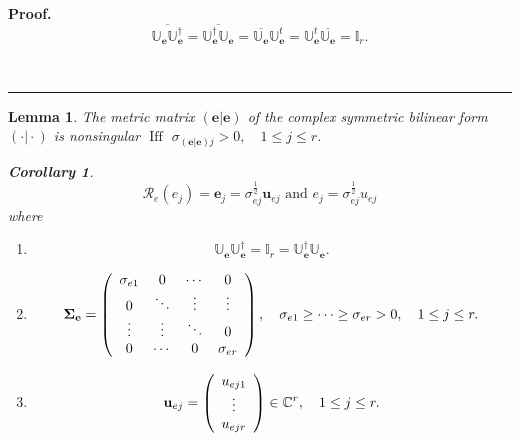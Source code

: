 \documentclass[aps,preprint]{revtex4}%
\newtheorem{corollary}[theorem]{Corollary}
\newtheorem{lemma}[theorem]{Lemma}
\newenvironment{proof}[1][Proof]{\noindent\textbf{#1.} }{\ \rule{0.5em}{0.5em}}
\begin{document}
\begin{proof}%
\begin{equation}
\overline{\mathbb{U}_{\mathbf{e}}\mathbb{U}_{\mathbf{e}}^{\dagger}}%
=\overline{\mathbb{U}_{\mathbf{e}}^{\dagger}\mathbb{U}_{\mathbf{e}}}%
=\overline{\mathbb{U}_{\mathbf{e}}}\mathbb{U}_{\mathbf{e}}^{t}=\mathbb{U}%
_{\mathbf{e}}^{t}\overline{\mathbb{U}_{\mathbf{e}}}=\mathbb{I}_{r}.
\end{equation}

\end{proof}

\begin{lemma}
The metric matrix $\left(  \left.  \mathbf{e}\right\vert \mathbf{e}\right)  $
of the complex symmetric bilinear form $\left(  \left.  \cdot\right\vert
\cdot\right)  $ is nonsingular $\operatorname*{Iff}$ $\sigma_{\left(  \left.
\mathbf{e}\right\vert \mathbf{e}\right)  j}>0,\quad1\leq j\leq r$.

\begin{corollary}%
\begin{equation}
\mathcal{R}_{e}\left(  e_{j}\right)  =\mathbf{e}_{j}=\sigma_{ej}^{\frac{1}{2}%
}\mathbf{u}_{ej}\text{ and }e_{j}=\sigma_{ej}^{\frac{1}{2}}u_{ej}%
\end{equation}
where
\end{corollary}

\begin{enumerate}
\item
\begin{equation}
\mathbb{U}_{\mathbf{e}}\mathbb{U}_{\mathbf{e}}^{\dagger}=\mathbb{I}%
_{r}=\mathbb{U}_{\mathbf{e}}^{\dagger}\mathbb{U}_{\mathbf{e}}.
\end{equation}


\item
\begin{equation}
\mathbf{\Sigma}_{\mathbf{e}}=\left(
\begin{array}
[c]{cccc}%
\sigma_{e1} & 0 & \cdots & 0\\
0 & \ddots & \vdots & \vdots\\
\vdots & \vdots & \ddots & 0\\
0 & \cdots & 0 & \sigma_{er}%
\end{array}
\right)  ,\quad\sigma_{e1}\geq\cdots\geq\sigma_{er}>0,\quad1\leq j\leq r.
\end{equation}


\item
\begin{equation}
\mathbf{u}_{ej}=\left(
\begin{array}
[c]{c}%
u_{ej1}\\
\vdots\\
u_{ejr}%
\end{array}
\right)  \in\mathbb{C}^{r},\quad1\leq j\leq r.
\end{equation}



\end{enumerate}
\end{lemma}
\end{document}
